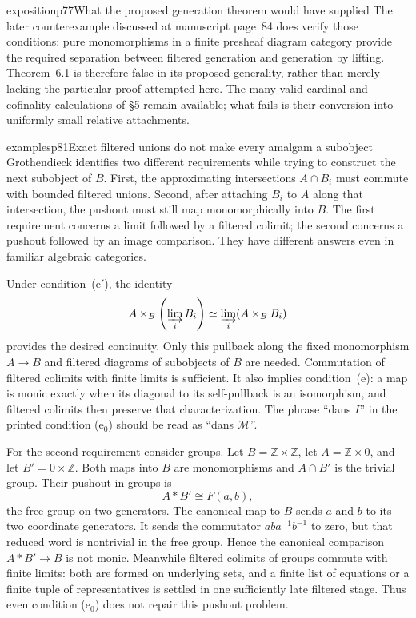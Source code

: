 \begin{dcomment}{exposition}{p77}{What the proposed generation theorem would have supplied}
The later counterexample discussed at manuscript page~84 does verify those conditions: pure monomorphisms in a finite presheaf diagram category provide the required separation between filtered generation and generation by lifting. Theorem~6.1 is therefore false in its proposed generality, rather than merely lacking the particular proof attempted here. The many valid cardinal and cofinality calculations of \S5 remain available; what fails is their conversion into uniformly small relative attachments.
\end{dcomment}

\begin{dcomment}{examples}{p81}{Exact filtered unions do not make every amalgam a subobject}
Grothendieck identifies two different requirements while trying to construct the next subobject of $B$. First, the approximating intersections $A\cap B_i$ must commute with bounded filtered unions. Second, after attaching $B_i$ to $A$ along that intersection, the pushout must still map monomorphically into $B$. The first requirement concerns a limit followed by a filtered colimit; the second concerns a pushout followed by an image comparison. They have different answers even in familiar algebraic categories.

Under condition~(e$'$), the identity
\[
 A\times_B\left(\varinjlim_iB_i\right)
       \simeq\varinjlim_i(A\times_BB_i)
\]
provides the desired continuity. Only this pullback along the fixed monomorphism $A\to B$ and filtered diagrams of subobjects of $B$ are needed. Commutation of filtered colimits with finite limits is sufficient. It also implies condition~(e): a map is monic exactly when its diagonal to its self-pullback is an isomorphism, and filtered colimits then preserve that characterization. The phrase ``dans $I$'' in the printed condition (e$_0$) should be read as ``dans $\mathcal M$''.

For the second requirement consider groups. Let $B=\mathbb Z\times\mathbb Z$, let $A=\mathbb Z\times0$, and let $B'=0\times\mathbb Z$. Both maps into $B$ are monomorphisms and $A\cap B'$ is the trivial group. Their pushout in groups is
\[
 A*B'\cong F(a,b),
\]
the free group on two generators. The canonical map to $B$ sends $a$ and $b$ to its two coordinate generators. It sends the commutator $aba^{-1}b^{-1}$ to zero, but that reduced word is nontrivial in the free group. Hence the canonical comparison $A*B'\to B$ is not monic. Meanwhile filtered colimits of groups commute with finite limits: both are formed on underlying sets, and a finite list of equations or a finite tuple of representatives is settled in one sufficiently late filtered stage. Thus even condition (e$_0$) does not repair this pushout problem.


\end{dcomment}
